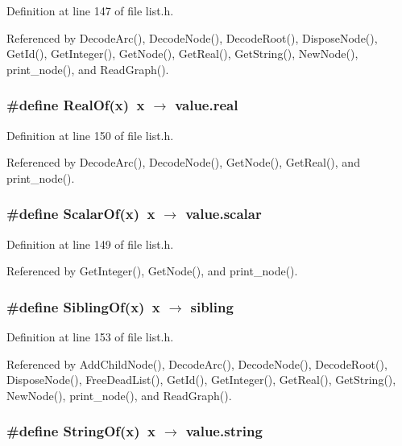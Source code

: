 Definition at line 147 of file list.h.

Referenced by Decode\-Arc(), Decode\-Node(), Decode\-Root(), Dispose\-Node(), Get\-Id(), Get\-Integer(), Get\-Node(), Get\-Real(), Get\-String(), New\-Node(), print\_\-node(), and Read\-Graph().
\subsubsection{\setlength{\rightskip}{0pt plus 5cm}\#define Real\-Of(x)~x $\rightarrow$ value.real}\label{list_8h_d73a8a3d2bbf39b5b812d5fe6cdd353c}




Definition at line 150 of file list.h.

Referenced by Decode\-Arc(), Decode\-Node(), Get\-Node(), Get\-Real(), and print\_\-node().
\subsubsection{\setlength{\rightskip}{0pt plus 5cm}\#define Scalar\-Of(x)~x $\rightarrow$ value.scalar}\label{list_8h_3da0a85df848fb5efdc096161cd9f2d7}




Definition at line 149 of file list.h.

Referenced by Get\-Integer(), Get\-Node(), and print\_\-node().
\subsubsection{\setlength{\rightskip}{0pt plus 5cm}\#define Sibling\-Of(x)~x $\rightarrow$ sibling}\label{list_8h_04eb77551d062b1c782280bfb5a0933f}




Definition at line 153 of file list.h.

Referenced by Add\-Child\-Node(), Decode\-Arc(), Decode\-Node(), Decode\-Root(), Dispose\-Node(), Free\-Dead\-List(), Get\-Id(), Get\-Integer(), Get\-Real(), Get\-String(), New\-Node(), print\_\-node(), and Read\-Graph().
\subsubsection{\setlength{\rightskip}{0pt plus 5cm}\#define String\-Of(x)~x $\rightarrow$ value.string}\label{list_8h_5299a6cb346d58c2d5d08280e2a6650e}




